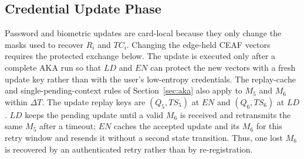 \documentclass[cmc,article,submit,moreauthors,pdftex]{Definitions/tsp}
\providecommand{\DIFadd}[1]{{\protect\color{blue} \sf #1}} %
\providecommand{\DIFaddbegin}{} %
\providecommand{\DIFaddend}{} %
\begin{document}
\DIFaddbegin \endgroup

\DIFaddend \subsection{Credential Update Phase}\label{sec:update}

Password and biometric updates are card-local because they only change the masks used to recover $R_i$ and $TC_i$. Changing the edge-held CEAF vectors requires the protected exchange below. The update is executed only after a complete AKA run so that $LD$ and $EN$ can protect the new vectors with a fresh update key rather than with the user's low-entropy credentials.
The replay-cache and single-pending-context rules of Section~\ref{sec:aka} also apply to $M_5$ and $M_6$ within $\Delta T$. The update replay keys are $(Q_5,TS_5)$ at $EN$ and $(Q_6,TS_6)$ at $LD$. \DIFaddbegin \DIFadd{$LD$ keeps the pending update until a valid $M_6$ is received and retransmits the same $M_5$ after a timeout; $EN$ caches the accepted update and its $M_6$ for this retry window and resends it without a second state transition. Thus, one lost $M_6$ is recovered by an authenticated retry rather than by re-registration.
}\DIFaddend 
\end{document}
